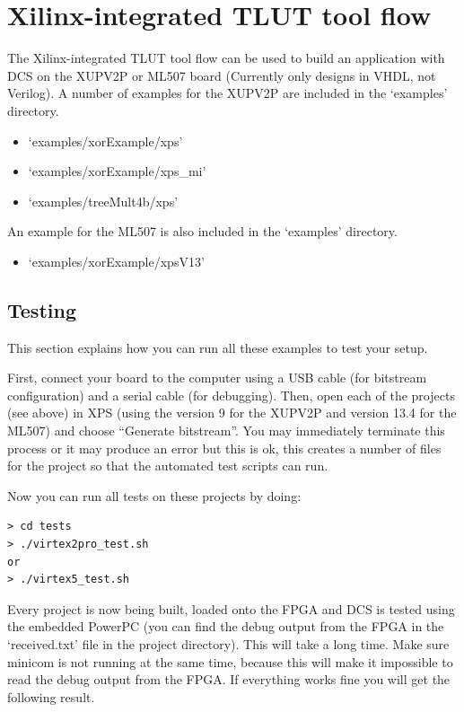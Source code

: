 \documentclass[a4paper,oneside]{memoir}
\begin{document}
\clearpage
\chapter{Xilinx-integrated TLUT tool flow}\label{sec:xilinx_flow}
The Xilinx-integrated TLUT tool flow can be used to build an application with DCS on the XUPV2P or ML507 board (Currently only designs in VHDL, not Verilog).
A number of examples for the XUPV2P are included in the `examples' directory.
\begin{itemize}
\item `examples/xorExample/xps'
\item `examples/xorExample/xps\_mi'
\item `examples/treeMult4b/xps'
\end{itemize}

An example for the ML507 is also included in the `examples' directory.
\begin{itemize}
\item `examples/xorExample/xpsV13'
\end{itemize}

\section{Testing}\label{sec:xilinx_testing}
This section explains how you can run  all these examples to test your setup.

First, connect your board to the computer using a USB cable (for bitstream configuration) and a serial cable (for debugging).
Then, open each of the projects (see above) in XPS (using the version 9 for the XUPV2P and version 13.4 for the ML507) and choose ``Generate bitstream''. You may immediately terminate this process or it may produce an error but this is ok, this creates a number of files for the project so that the automated test scripts can run.


Now you can run all tests on these projects by doing:
\begin{lstlisting}
> cd tests
> ./virtex2pro_test.sh
or
> ./virtex5_test.sh
\end{lstlisting}

Every project is now being built, loaded onto the FPGA and DCS is tested using the embedded PowerPC (you can find the debug output from the FPGA in the `received.txt' file in the project directory). This will take a long time. Make sure minicom is not running at the same time, because this will make it impossible to read the debug output from the FPGA. If everything works fine you will get the following result. 
\end{document}
